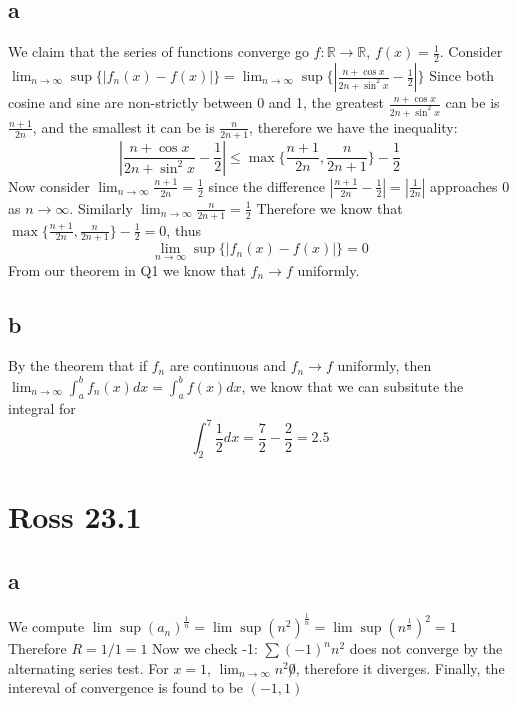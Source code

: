 \documentclass[12pt]{article}
\newcommand{\R}{\mathbb{R}}
\begin{document}
\subsection{a}
We claim that the series of functions converge go $f: \R \to \R$, $f(x) = \frac{1}{2}$. Consider $\lim_{n \to \infty} \sup \{ |f_n(x)-f(x)|\} = \lim_{n \to \infty} \sup \{ |\frac{n + \cos x}{2n + \sin^2x}-\frac{1}{2}|\}$
\newline
Since both cosine and sine are non-strictly between 0 and 1, the greatest $\frac{n + \cos x}{2n + \sin^2x}$ can be is $\frac{n+1}{2n}$, and the smallest it can be is $\frac{n}{2n+1}$, therefore we have the inequality:
$$|\frac{n + \cos x}{2n + \sin^2x}-\frac{1}{2}| \leq \max \{\frac{n+1}{2n}, \frac{n}{2n+1}\} - \frac{1}{2}$$
Now consider $\lim_{n \to \infty}\frac{n+1}{2n} = \frac{1}{2}$ since the difference $|\frac{n+1}{2n}-\frac{1}{2}| = |\frac{1}{2n}|$ approaches 0 as $n \to \infty$. Similarly $\lim_{n \to \infty}\frac{n}{2n+1} = \frac{1}{2}$
\newline
Therefore we know that $\max \{\frac{n+1}{2n}, \frac{n}{2n+1}\} - \frac{1}{2} = 0$, thus
$$\lim_{n \to \infty} \sup \{ |f_n(x)-f(x)|\} = 0$$
From our theorem in Q1 we know that $f_n \to f$ uniformly.

\subsection{b}
By the theorem that if $f_n$ are continuous and $f_n \to f$ uniformly, then $\lim_{n \to \infty} \int_a^b f_n(x) dx= \int_a^b f(x)dx$, we know that we can subsitute the integral for
$$\int_2^7 \frac{1}{2}dx = \frac{7}{2}-\frac{2}{2} = 2.5$$
\newpage


\section{Ross 23.1}
\subsection{a}
We compute $\lim \sup (a_n)^\frac{1}{n} = \lim \sup (n^2)^\frac{1}{n} = \lim \sup (n^\frac{1}{n})^2 = 1$
Therefore $R = 1/1 = 1$
\newline
Now we check -1: $\sum (-1)^nn^2$ does not converge by the alternating series test.
\newline
For $x=1$, $\lim_{n \to \infty} n^2 \not 0$, therefore it diverges.
\newline
Finally, the intereval of convergence is found to be $(-1,1)$
\end{document}
